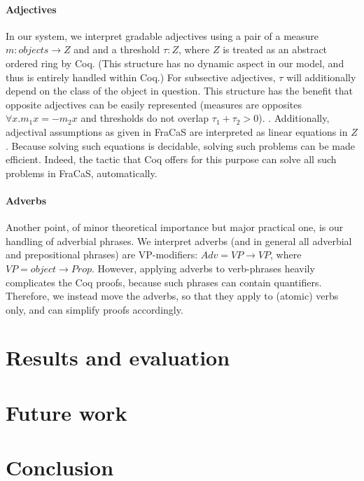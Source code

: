 \documentclass{article}
\begin{document}
\paragraph{Adjectives}
In our system, we interpret gradable adjectives using a pair of a
measure $m : objects → Z$ and and a threshold $τ : Z$, where $Z$ is
treated as an abstract ordered ring by Coq. (This structure has no
dynamic aspect in our model, and thus is entirely handled within Coq.)
For subsective adjectives, $τ$ will additionally depend on the class
of the object in question. This structure has the benefit that
opposite adjectives can be easily represented (measures are opposites
$∀x. m_1 x = -m_2 x$ and thresholds do not overlap $τ_1 + τ_2 > 0$).
.  Additionally,
adjectival assumptions as given in FraCaS are interpreted as linear
equations in $Z$. Because solving such equations is decidable, solving
such problems can be made efficient. Indeed, the tactic that Coq
offers for this purpose can solve all such problems in FraCaS,
automatically.


\paragraph{Adverbs}
Another point, of minor theoretical importance but major practical
one, is our handling of adverbial phrases. We interpret adverbs (and
in general all adverbial and prepositional phrases) are VP-modifiers:
$Adv = VP → VP$, where $VP = object → Prop$. However, applying
adverbs to verb-phrases heavily complicates the Coq proofs, because
such phrases can contain quantifiers. Therefore, we instead move the
adverbs, so that they apply to (atomic) verbs only, and can simplify
proofs accordingly. 



\section{Results and evaluation}

\section{Future work}
\section{Conclusion}


\printbibliography
\end{document}
